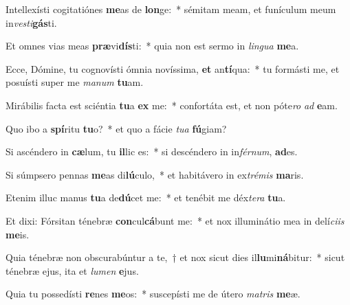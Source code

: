 \item Intellexísti cogitatiónes \textbf{me}as de \textbf{lon}ge:~* sémitam meam, et funículum meum in\textit{ves}\textit{ti}\textbf{gás}ti.
\item Et omnes vias meas \textbf{præ}vi\textbf{dís}ti:~* quia non est sermo in \textit{lin}\textit{gua} \textbf{me}a.
\item Ecce, Dómine, tu cognovísti ómnia novíssima, \textbf{et} an\textbf{tí}qua:~* tu formásti me, et posuísti super me \textit{ma}\textit{num} \textbf{tu}am.
\item Mirábilis facta est sciéntia \textbf{tu}a \textbf{ex} me:~* confortáta est, et non póte\textit{ro} \textit{ad} \textbf{e}am.
\item Quo ibo a \textbf{spí}ritu \textbf{tu}o?~* et quo a fácie \textit{tu}\textit{a} \textbf{fú}giam?
\item Si ascéndero in \textbf{cæ}lum, tu \textbf{il}lic es:~* si descéndero in in\textit{fér}\textit{num}, \textbf{ad}es.
\item Si súmpsero pennas \textbf{me}as di\textbf{lú}culo,~* et habitávero in ex\textit{tré}\textit{mis} \textbf{ma}ris.
\item Etenim illuc manus \textbf{tu}a de\textbf{dú}cet me:~* et tenébit me déx\textit{te}\textit{ra} \textbf{tu}a.
\item Et dixi: Fórsitan ténebræ \textbf{con}cul\textbf{cá}bunt me:~* et nox illuminátio mea in delí\textit{ci}\textit{is} \textbf{me}is.
\item Quia ténebræ non obscurabúntur a te,~† et nox sicut dies il\textbf{lu}mi\textbf{ná}bitur:~* sicut ténebræ ejus, ita et \textit{lu}\textit{men} \textbf{e}jus.
\item Quia tu possedísti \textbf{re}nes \textbf{me}os:~* suscepísti me de útero \textit{ma}\textit{tris} \textbf{me}æ.
